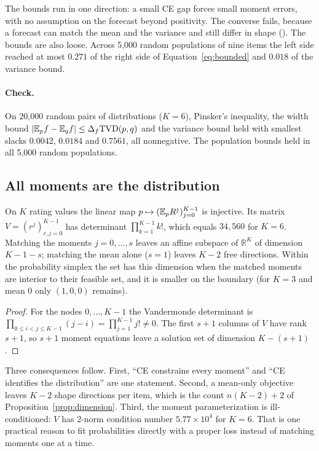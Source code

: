 The bounds run in one direction: a small CE gap forces small moment errors, with no assumption on the forecast beyond positivity.
The converse fails, because a forecast can match the mean and the variance and still differ in shape ().
The bounds are also loose.
Across 5,000 random populations of nine items the left side reached at most $0.271$ of the right side of Equation~\eqref{eq:bounded} and $0.018$ of the variance bound.

\paragraph{Check.}
On 20,000 random pairs of distributions ($K=6$), Pinsker's inequality, the width bound $|\mathbb{E}_pf-\mathbb{E}_qf|\le\Delta_f\mathrm{TVD}(p,q)$ and the variance bound held with smallest slacks $0.0042$, $0.0184$ and $0.7561$, all nonnegative.
The population bounds held in all 5,000 random populations.

\subsection{All moments are the distribution}
\label{app:moments-vander}

\begin{proposition}
\label{prop:vander}
On $K$ rating values the linear map $p\mapsto(\mathbb{E}_pR^j)_{j=0}^{K-1}$ is injective.
Its matrix $V=(r^j)_{r,j=0}^{K-1}$ has determinant $\prod_{k=1}^{K-1}k!$, which equals $34{,}560$ for $K=6$.
Matching the moments $j=0,\dots,s$ leaves an affine subspace of $\mathbb R^K$ of dimension $K-1-s$; matching the mean alone ($s=1$) leaves $K-2$ free directions.
Within the probability simplex the set has this dimension when the matched moments are interior to their feasible set, and it is smaller on the boundary (for $K=3$ and mean $0$ only $(1,0,0)$ remains).
\end{proposition}

\begin{proof}
For the nodes $0,\dots,K-1$ the Vandermonde determinant is $\prod_{0\le i<j\le K-1}(j-i)=\prod_{j=1}^{K-1}j!\ne0$.
The first $s+1$ columns of $V$ have rank $s+1$, so $s+1$ moment equations leave a solution set of dimension $K-(s+1)$.
\end{proof}

Three consequences follow.
First, ``CE constrains every moment'' and ``CE identifies the distribution'' are one statement.
Second, a mean-only objective leaves $K-2$ shape directions per item, which is the count $n(K-2)+2$ of Proposition~\ref{prop:dimension}.
Third, the moment parameterization is ill-conditioned: $V$ has 2-norm condition number $5.77\times10^{4}$ for $K=6$.
That is one practical reason to fit probabilities directly with a proper loss instead of matching moments one at a time.

